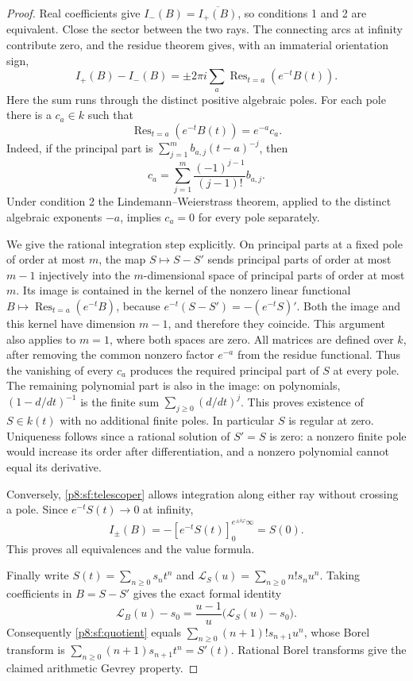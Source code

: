 \documentclass[11pt,a4paper]{article}
\theoremstyle{definition}
\theoremstyle{remark}
\numberwithin{equation}{section}
\begin{document}
\begin{proof}
Real coefficients give $I_-(B)=\overline{I_+(B)}$, so conditions
1 and 2 are equivalent. Close the sector between the two rays.
The connecting arcs at infinity contribute zero, and the residue
theorem gives, with an immaterial orientation sign,
\[
 I_+(B)-I_-(B)
   =\pm2\pi i\sum_{a}\operatorname{Res}_{t=a}(e^{-t}B(t)).
\]
Here the sum runs through the distinct positive algebraic poles.
For each pole there is a $c_a\in k$ such that
\[
 \operatorname{Res}_{t=a}(e^{-t}B(t))=e^{-a}c_a.
\]
Indeed, if the principal part is
$\sum_{j=1}^{m}b_{a,j}(t-a)^{-j}$, then
\[
 c_a=\sum_{j=1}^{m}\frac{(-1)^{j-1}}{(j-1)!}b_{a,j}.
\]
Under condition 2 the Lindemann--Weierstrass theorem, applied to
the distinct algebraic exponents $-a$, implies $c_a=0$ for every
pole separately.

We give the rational integration step explicitly. On principal
parts at a fixed pole of order at most $m$, the map
$S\mapsto S-S'$ sends principal parts of order at most $m-1$
injectively into the $m$-dimensional space of principal parts of
order at most $m$. Its image is contained in the kernel of the
nonzero linear functional
$B\mapsto\operatorname{Res}_{t=a}(e^{-t}B)$, because
$e^{-t}(S-S')=-(e^{-t}S)'$. Both the image and this kernel have
dimension $m-1$, and therefore they coincide. This argument also
applies to $m=1$, where both spaces are zero. All matrices are
defined over $k$, after removing the common nonzero factor
$e^{-a}$ from the residue functional.
Thus the vanishing of every $c_a$ produces the required principal
part of $S$ at every pole. The remaining polynomial part is also
in the image: on polynomials, $(1-d/dt)^{-1}$ is the finite sum
$\sum_{j\ge0}(d/dt)^j$. This proves existence of $S\in k(t)$
with no additional finite poles. In particular $S$ is regular at
zero. Uniqueness follows since a rational solution of $S'=S$ is
zero: a nonzero finite pole would increase its order after
differentiation, and a nonzero polynomial cannot equal its
derivative.

Conversely, \eqref{p8:sf:telescoper} allows integration along either
ray without crossing a pole. Since $e^{-t}S(t)\to0$ at infinity,
\[
 I_\pm(B)=-[e^{-t}S(t)]_0^{e^{\pm i\varphi}\infty}=S(0).
\]
This proves all equivalences and the value formula.

Finally write $S(t)=\sum_{n\ge0}s_nt^n$ and
$\mathcal L_S(u)=\sum_{n\ge0}n!s_nu^n$.
Taking coefficients in $B=S-S'$ gives the exact formal identity
\[
 \mathcal L_B(u)-s_0
 =\frac{u-1}{u}\bigl(\mathcal L_S(u)-s_0\bigr).
\]
Consequently \eqref{p8:sf:quotient} equals
$\sum_{n\ge0}(n+1)!s_{n+1}u^n$, whose Borel transform is
$\sum_{n\ge0}(n+1)s_{n+1}t^n=S'(t)$. Rational Borel transforms
give the claimed arithmetic Gevrey property.
\end{proof}
\end{document}
